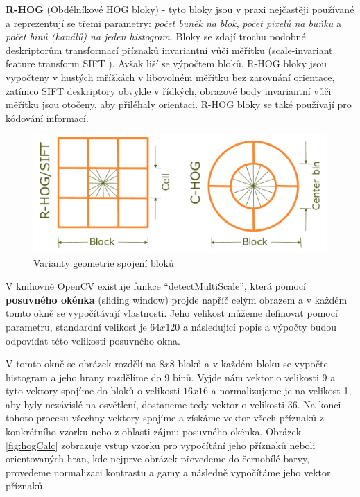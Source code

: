 \textbf{R-HOG} (Obdélníkové HOG bloky) - tyto bloky jsou v praxi nejčastěji používané a reprezentují se třemi parametry: \textit{počet buněk na blok}, \textit{počet pixelů na buňku} a \textit{počet binů (kanálů) na jeden histogram}. Bloky se zdají trochu podobné deskriptorům transformací příznaků invariantní vůči měřítku (scale-invariant feature transform SIFT \cite{siftPaper}). Avšak liší se výpočtem bloků. R-HOG bloky jsou vypočteny v hustých mřížkách v libovolném měřítku bez zarovnání orientace, zatímco SIFT deskriptory obvykle v řídkých, obrazové body invariantní vůči měřítku jsou otočeny, aby přiléhaly orientaci. R-HOG bloky se také používají pro kódování informací. 
\begin{figure}[H]
  \centering
  \includegraphics[width=14cm]{figures/hog_variants.pdf}
  \caption{Varianty geometrie spojení bloků \cite{hog:dalal}}
  \label{variants_block}
\end{figure}
V knihovně OpenCV existuje funkce ``detectMultiScale'', která pomocí \textbf{posuvného okénka} (sliding window) projde napříč celým obrazem a v každém tomto okně se vypočítávají vlastnosti. Jeho velikost můžeme definovat pomocí parametru, standardní velikost je $64x120$ a následující popis a výpočty budou odpovídat této velikosti posuvného okna.  

V tomto okně se obrázek rozdělí na $8x8$ bloků a v každém bloku se vypočte histogram a jeho hrany rozdělíme do 9 binů. Vyjde nám vektor o velikosti 9 a tyto vektory spojíme do bloků o velikosti $16x16$ a normalizujeme je na velikost 1, aby byly nezávislé na osvětlení, dostaneme tedy vektor o velikosti 36. Na konci tohoto procesu všechny vektory spojíme a získáme vektor všech příznaků z konkrétního vzorku nebo z oblasti zájmu posuvného okénka. Obrázek \ref{fig:hogCalc} zobrazuje vstup vzorku pro vypočítání jeho příznaků neboli orientovaných hran, kde nejprve obrázek převedeme do černobílé barvy, provedeme normalizaci kontrastu a gamy a následně vypočítáme jeho vektor příznaků.

